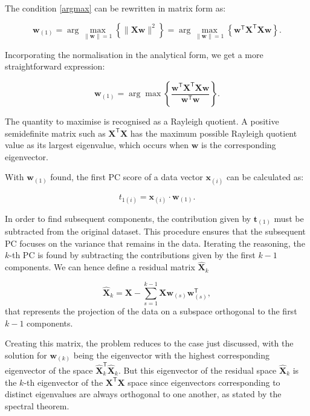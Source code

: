 The condition \ref{argmax} can be rewritten in matrix form as:

\begin{equation}
\mathbf{w}_{(1)} = \arg \max_{\|\mathbf{w}\| = 1} \left\{ \|\mathbf{Xw}\|^2 \right\} = \arg \max_{\|\mathbf{w}\| = 1} \left\{ \mathbf{w}^{\mathsf{T}} \mathbf{X}^{\mathsf{T}} \mathbf{Xw} \right\}.
\end{equation}

Incorporating the normalisation in the analytical form, we get a more straightforward expression:

\begin{equation}
\mathbf{w}_{(1)} = \arg \max \left\{ \frac{\mathbf{w}^{\mathsf{T}} \mathbf{X}^{\mathsf{T}} \mathbf{Xw}}{\mathbf{w}^{\mathsf{T}} \mathbf{w}} \right\}.\label{first_weight}
\end{equation}

The quantity to maximise is recognised as a Rayleigh quotient\cite{horn13}. A positive semidefinite matrix such as $\mathbf{X}^{\mathsf{T}} \mathbf{X}$ has the maximum possible Rayleigh quotient value as its largest eigenvalue, which occurs when $\mathbf{w}$ is the corresponding eigenvector\cite{parlett1998symmetric}.


With $\mathbf{w}_{(1)}$ found, the first PC score of a data vector $\mathbf{x}_{(i)}$ can be calculated as:

\begin{equation}
t_{1(i)} = \mathbf{x}_{(i)} \cdot \mathbf{w}_{(1)}.\label{first_score}
\end{equation}

In order to find subsequent components, the contribution given by $\mathbf{t}_{(1)}$ must be subtracted from the original dataset. This procedure ensures that the subsequent PC focuses on the variance that remains in the data. Iterating the reasoning, the $k$-th PC is found by subtracting the contributions given by the first $k-1$ components. We can hence define a residual matrix $\mathbf{\hat{X}}_{k}$

\begin{equation}
\mathbf{\hat{X}}_{k} = \mathbf{X} - \sum_{s=1}^{k-1} \mathbf{X} \mathbf{w}_{(s)} \mathbf{w}_{(s)}^{\mathsf{T}},\label{dim_red_tran}
\end{equation}
that represents the projection of the data on a subspace orthogonal to the first $k-1$ components.

Creating this matrix, the problem reduces to the case just discussed, with the solution for $\mathbf{w}_{(k)}$ being the eigenvector with the highest corresponding eigenvector of the space $\mathbf{\hat{X}}_{k}^\mathsf{T}\mathbf{\hat{X}}_{k}$. But this eigenvector of the residual space $\mathbf{\hat{X}}_{k}$ is the $k$-th  eigenvector of the $\mathbf{X}^{\mathsf{T}} \mathbf{X}$ space since eigenvectors corresponding to distinct eigenvalues are always orthogonal to one another, as stated by the spectral theorem.

